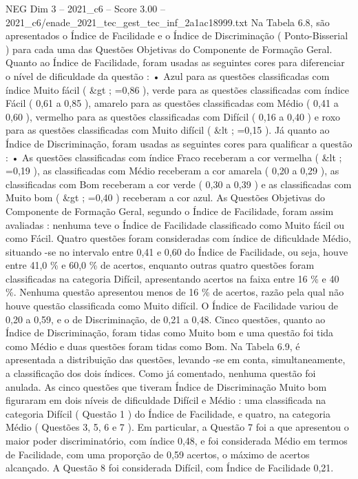 \begin{textsample}{NEG Dim 3 – 2021\_c6 – Score 3.00 – 2021\_c6/enade\_2021\_tec\_gest\_tec\_inf\_2a1ac18999.txt}
Na Tabela 6.8, são apresentados o Índice de Facilidade e o Índice de Discriminação ( Ponto-Bisserial ) para cada uma das Questões Objetivas do Componente de Formação Geral.
Quanto ao Índice de Facilidade, foram usadas as seguintes cores para diferenciar o nível de dificuldade da questão : • Azul para as questões classificadas com índice Muito fácil ( \&gt ; =0,86 ), verde para as questões classificadas com índice Fácil ( 0,61 a 0,85 ), amarelo para as questões classificadas com Médio ( 0,41 a 0,60 ), vermelho para as questões classificadas com Difícil ( 0,16 a 0,40 ) e roxo para as questões classificadas com Muito difícil ( \&lt ; =0,15 ).
Já quanto ao Índice de Discriminação, foram usadas as seguintes cores para qualificar a questão : • As questões classificadas com índice Fraco receberam a cor vermelha ( \&lt ; =0,19 ), as classificadas com Médio receberam a cor amarela ( 0,20 a 0,29 ), as classificadas com Bom receberam a cor verde ( 0,30 a 0,39 ) e as classificadas com Muito bom ( \&gt ; =0,40 ) receberam a cor azul.
As Questões Objetivas do Componente de Formação Geral, segundo o Índice de Facilidade, foram assim avaliadas : nenhuma teve o Índice de Facilidade classificado como Muito fácil ou como Fácil.
Quatro questões foram consideradas com índice de dificuldade Médio, situando -se no intervalo entre 0,41 e 0,60 do Índice de Facilidade, ou seja, houve entre 41,0 \% e 60,0 \% de acertos, enquanto outras quatro questões foram classificadas na categoria Difícil, apresentando acertos na faixa entre 16 \% e 40 \%.
Nenhuma questão apresentou menos de 16 \% de acertos, razão pela qual não houve questão classificada como Muito difícil.
O Índice de Facilidade variou de 0,20 a 0,59, e o de Discriminação, de 0,21 a 0,48.
Cinco questões, quanto ao Índice de Discriminação, foram tidas como Muito bom e uma questão foi tida como Médio e duas questões foram tidas como Bom.
Na Tabela 6.9, é apresentada a distribuição das questões, levando -se em conta, simultaneamente, a classificação dos dois índices.
Como já comentado, nenhuma questão foi anulada.
As cinco questões que tiveram Índice de Discriminação Muito bom figuraram em dois níveis de dificuldade Difícil e Médio : uma classificada na categoria Difícil ( Questão 1 ) do Índice de Facilidade, e quatro, na categoria Médio ( Questões 3, 5, 6 e 7 ).
Em particular, a Questão 7 foi a que apresentou o maior poder discriminatório, com índice 0,48, e foi considerada Médio em termos de Facilidade, com uma proporção de 0,59 acertos, o máximo de acertos alcançado.
A Questão 8 foi considerada Difícil, com Índice de Facilidade 0,21.

\end{textsample}
